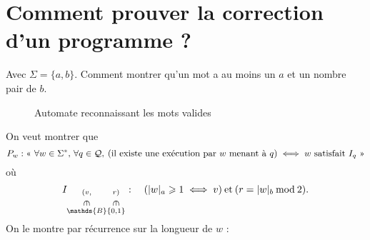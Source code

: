 \section{Comment prouver la correction d'un programme ?}

Avec $\Sigma = \{a,b\}$. Comment montrer qu'un mot a au moins un $a$\/ et un nombre pair de $b$.

\begin{figure}[H]
	\centering
	\caption{Automate reconnaissant les mots valides}
\end{figure}

On veut montrer que \[
	P_w : \text{\guillemotleft~}\forall w \in \Sigma^*,\, \forall q \in \mathcal{Q},\:(\text{il existe une exécution par $w$\/ menant à $q$}) \iff w \text{ satisfait } I_q\text{~\guillemotright}
\]
où \[
	I_{\substack{(v,\\\vrt\in\\\mathds{B}}\substack{r)\\\vrt\in\\\{0,1\}}} : \quad
		(|w|_a \ge 1 \iff v)\:\text{et}\:(r = |w|_b\:\text{mod}\:2)
.\]
On le montre par récurrence sur la longueur de $w$\/ : 

